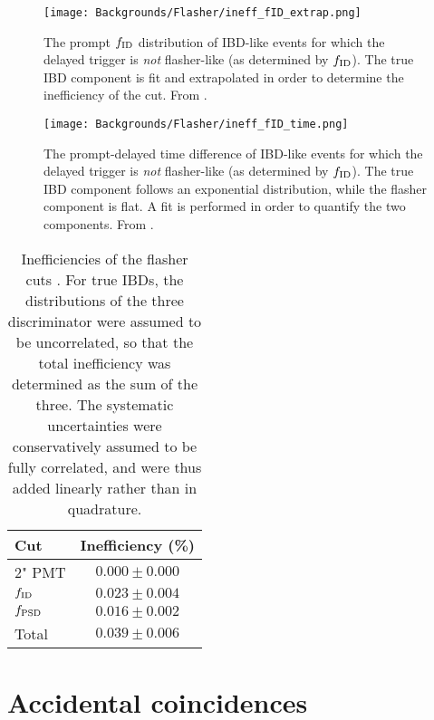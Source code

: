 \documentclass[../thesis.tex]{subfiles}
\begin{document}
\begin{figure}[ht]
  \texttt{[image: Backgrounds/Flasher/ineff\_fID\_extrap.png]}
  \caption{The prompt $f_{\mathrm{ID}}$ distribution of IBD-like events for which the delayed trigger is \emph{not} flasher-like (as determined by $f_{\mathrm{ID}}$). The true IBD component is fit and extrapolated in order to determine the inefficiency of the cut. From \cite{patrickFlashers}.}
  \label{fig:flasher_fID_extrap}
\end{figure}

\begin{figure}[ht]
  \texttt{[image: Backgrounds/Flasher/ineff\_fID\_time.png]}
  \caption{The prompt-delayed time difference of IBD-like events for which the delayed trigger is \emph{not} flasher-like (as determined by $f_{\mathrm{ID}}$). The true IBD component follows an exponential distribution, while the flasher component is flat. A fit is performed in order to quantify the two components. From \cite{patrickFlashers}.}
  \label{fig:flasher_fID_time}
\end{figure}

\begin{table}[ht]
  \begin{tabular}{lc}
    \toprule
    Cut & Inefficiency (\%) \\
    \midrule
    2" PMT  & $0.000 \pm 0.000$ \\
    $f_{\mathrm{ID}}$  & $0.023 \pm 0.004$ \\
    $f_{\mathrm{PSD}}$ & $0.016 \pm 0.002$ \\
    \midrule
    Total & $0.039 \pm 0.006$ \\
    \bottomrule
  \end{tabular}
  \caption{Inefficiencies of the flasher cuts \cite{patrickFlashers}. For true IBDs, the distributions of the three discriminator were assumed to be uncorrelated, so that the total inefficiency was determined as the sum of the three. The systematic uncertainties were conservatively assumed to be fully correlated, and were thus added linearly rather than in quadrature.}
  \label{tab:flasher_ineff}
\end{table}




\section{Accidental coincidences}
\label{sec:accbkg}
\end{document}
